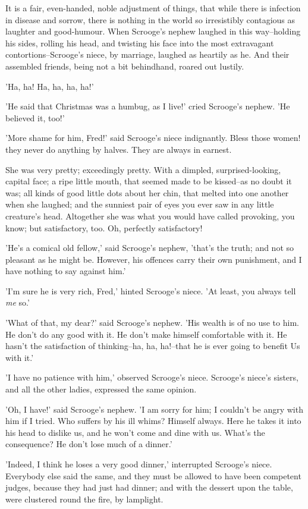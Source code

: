 It is a fair, even-handed, noble adjustment of things, that while there
is infection in disease and sorrow, there is nothing in the world so
irresistibly contagious as laughter and good-humour. When Scrooge's
nephew laughed in this way--holding his sides, rolling his head, and
twisting his face into the most extravagant contortions--Scrooge's
niece, by marriage, laughed as heartily as he. And their assembled
friends, being not a bit behindhand, roared out lustily.

'Ha, ha! Ha, ha, ha, ha!'

'He said that Christmas was a humbug, as I live!' cried Scrooge's
nephew. 'He believed it, too!'

'More shame for him, Fred!' said Scrooge's niece indignantly. Bless
those women! they never do anything by halves. They are always in
earnest.

She was very pretty; exceedingly pretty. With a dimpled,
surprised-looking, capital face; a ripe little mouth, that seemed made
to be kissed--as no doubt it was; all kinds of good little dots about
her chin, that melted into one another when she laughed; and the
sunniest pair of eyes you ever saw in any little creature's head.
Altogether she was what you would have called provoking, you know; but
satisfactory, too. Oh, perfectly satisfactory!

'He's a comical old fellow,' said Scrooge's nephew, 'that's the truth;
and not so pleasant as he might be. However, his offences carry their
own punishment, and I have nothing to say against him.'

'I'm sure he is very rich, Fred,' hinted Scrooge's niece. 'At least, you
always tell \emph{me} so.'

'What of that, my dear?' said Scrooge's nephew. 'His wealth is of no use
to him. He don't do any good with it. He don't make himself comfortable
with it. He hasn't the satisfaction of thinking--ha, ha, ha!--that he is
ever going to benefit Us with it.'

'I have no patience with him,' observed Scrooge's niece. Scrooge's
niece's sisters, and all the other ladies, expressed the same opinion.

'Oh, I have!' said Scrooge's nephew. 'I am sorry for him; I couldn't be
angry with him if I tried. Who suffers by his ill whims? Himself always.
Here he takes it into his head to dislike us, and he won't come and dine
with us. What's the consequence? He don't lose much of a dinner.'

'Indeed, I think he loses a very good dinner,' interrupted Scrooge's
niece. Everybody else said the same, and they must be allowed to have
been competent judges, because they had just had dinner; and with the
dessert upon the table, were clustered round the fire, by lamplight.

